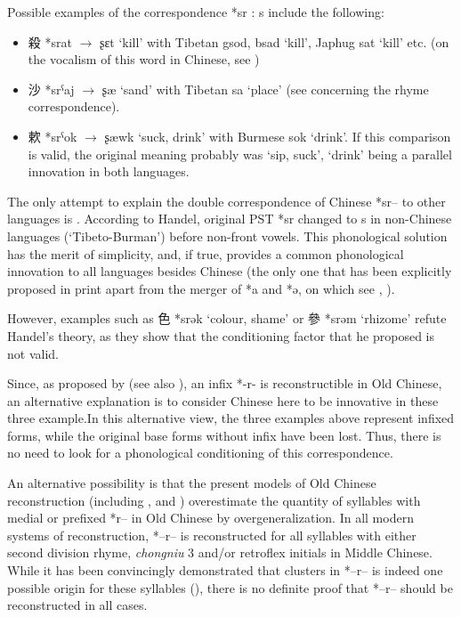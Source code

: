 \documentclass[oldfontcommands,oneside,a4paper,11pt]{article}
\newcommand{\ipa}[1]{{\phon #1}} %
\newcommand{\zh}[1]{{\cn #1}}
\newcommand{\archaic}[4]{\zh{#1} *\ipa{#2} $\rightarrow$ \ipa{#3} `#4'}
\begin{document}
Possible examples of the correspondence *\ipa{sr} : \ipa{s} include the following:

\begin{itemize}

\item  \archaic{殺}{srat}{ʂɛt}{kill} with Tibetan \ipa{gsod, bsad} `kill', Japhug \ipa{sat} `kill' etc. (on the vocalism of this word in Chinese, see \citealt[214]{bs14oc})

\item \archaic{沙}{srˁaj}{ʂæ}{sand}  with Tibetan \ipa{sa} `place' (see \citealt{hill14jrn} concerning the rhyme correspondence).

\item  \archaic{欶}{srˁok}{ʂæwk}{suck, drink} with Burmese \ipa{sok} `drink'. If this comparison is valid, the original meaning probably was `sip, suck', `drink' being a parallel innovation in both languages.

\end{itemize}
The only attempt to explain the double correspondence of Chinese *\ipa{sr--} to other languages is \citet[25]{handel02r}. According to Handel, original PST *\ipa{sr} changed to s in non-Chinese languages (`Tibeto-Burman') before non-front vowels. This phonological solution has the merit of simplicity, and, if true, provides a common phonological innovation to all languages besides Chinese (the only one that has been explicitly proposed in print apart from the merger of *\ipa{a} and *\ipa{ə}, on which see \citealt{gong95st}, \citealt{handel08st}).

However, examples such as \zh{色} *\ipa{srək} `colour, shame' or \zh{參} *\ipa{srəm} `rhizome' refute Handel's theory, as they show that the conditioning factor that he proposed is not valid.

Since, as proposed by \citet{sagart99roc}(see also \citealt[57-8]{bs14oc}), an infix *\ipa{-r-} is reconstructible in Old Chinese, an alternative explanation is to consider Chinese here to be innovative in these three example.In this alternative view, the three examples above represent infixed forms, while the original base forms without infix have been lost. Thus, there is no need to look for a phonological conditioning of this correspondence.

An alternative possibility is that the present models of Old Chinese reconstruction (including \citealt{starostin89}, \citealt{schuessler09minimal} and \citealt{bs14oc}) overestimate the quantity of syllables with medial or prefixed *\ipa{r}-- in Old Chinese by overgeneralization. In all modern systems of reconstruction,  *--\ipa{r}--  is reconstructed for all syllables with either second division rhyme, 	\textit{chongniu} 3 and/or retroflex initials in Middle Chinese. While it has been convincingly demonstrated that clusters in *--\ipa{r}-- is indeed one possible origin for these syllables (\citealt{yakhontov61sochetaniya}), there is no definite proof that  *--\ipa{r}-- should be reconstructed in all cases. 
\end{document}
